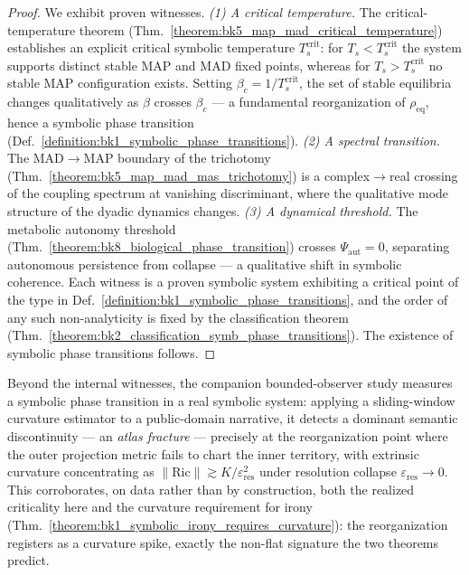 \begin{proof}
\label{proof:bk1_realization_of_symbolic_phase_transitions}
\leavevmode
We exhibit proven witnesses. \emph{(1) A critical temperature.} The critical-temperature theorem (Thm.~\ref{theorem:bk5_map_mad_critical_temperature}) establishes an explicit critical symbolic temperature $T_s^{\text{crit}}$: for $T_s < T_s^{\text{crit}}$ the system supports distinct stable MAP and MAD fixed points, whereas for $T_s > T_s^{\text{crit}}$ no stable MAP configuration exists. Setting $\beta_c = 1/T_s^{\text{crit}}$, the set of stable equilibria changes qualitatively as $\beta$ crosses $\beta_c$ --- a fundamental reorganization of $\rho_{\text{eq}}$, hence a symbolic phase transition (Def.~\ref{definition:bk1_symbolic_phase_transitions}). \emph{(2) A spectral transition.} The MAD$\to$MAP boundary of the trichotomy (Thm.~\ref{theorem:bk5_map_mad_mas_trichotomy}) is a complex$\to$real crossing of the coupling spectrum at vanishing discriminant, where the qualitative mode structure of the dyadic dynamics changes. \emph{(3) A dynamical threshold.} The metabolic autonomy threshold (Thm.~\ref{theorem:bk8_biological_phase_transition}) crosses $\Psi_{\mathrm{aut}} = 0$, separating autonomous persistence from collapse --- a qualitative shift in symbolic coherence. Each witness is a proven symbolic system exhibiting a critical point of the type in Def.~\ref{definition:bk1_symbolic_phase_transitions}, and the order of any such non-analyticity is fixed by the classification theorem (Thm.~\ref{theorem:bk2_classification_symb_phase_transitions}). The existence of symbolic phase transitions follows.
\end{proof}

\begin{remark}
\label{remark:bk1_atlas_fracture_empirical}
Beyond the internal witnesses, the companion bounded-observer study
\citep{tiffany2025wicked} measures a symbolic phase transition in a real
symbolic system: applying a sliding-window curvature estimator to a
public-domain narrative, it detects a dominant semantic discontinuity --- an
\emph{atlas fracture} --- precisely at the reorganization point where the
outer projection metric fails to chart the inner territory, with extrinsic
curvature concentrating as $\|\mathrm{Ric}\|\gtrsim K/\varepsilon_{\mathrm{res}}^2$
under resolution collapse $\varepsilon_{\mathrm{res}}\to 0$. This corroborates,
on data rather than by construction, both the realized criticality here and the
curvature requirement for irony
(Thm.~\ref{theorem:bk1_symbolic_irony_requires_curvature}): the reorganization
registers as a curvature spike, exactly the non-flat signature the two theorems
predict.
\end{remark}

